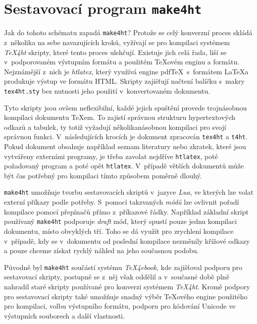 \documentclass{csbulletin}
\newcommand\nazev[1]{\textit{#1}}
\newcommand\prikaz[1]{\texttt{#1}}
\begin{document}
\section{Sestavovací program \prikaz{make4ht}}

Jak do tohoto schématu zapadá \prikaz{make4ht}? Protože se celý konverzní proces
skládá z~několika na sebe navazujících kroků, vyžívají se pro kompilaci
systémem \nazev{TeX4ht} skripty, které tento proces ulehčují. Existuje jich
celá řada, liší se v~podporovaném výstupním formátu a použitém \TeX ovém enginu
a formátu. Nejznámější z~nich je \nazev{htlatex}, který využívá engine pdf\TeX\
s~formátem \LaTeX a produkuje výstup ve formátu HTML. Skripty zajišťují načtení
balíčku s~makry \prikaz{tex4ht.sty} bez nutnosti jeho použití
v~konvertovaném dokumentu.

Tyto skripty jsou ovšem neflexibilní, každé jejich spuštění provede
trojnásobnou kompilaci dokumentu \TeX em. To zajistí správnou strukturu
hypertextových odkazů a tabulek, ty totiž vyžadují několikanásobnou kompilaci
pro svojí správnou funkci. V~následujících krocích je dokument zpracován
\prikaz{tex4ht} a \prikaz{t4ht}. Pokud dokument obsahuje například seznam
literatury nebo zkratek, které jsou vytvářeny externími programy, je třeba
zavolat nejdříve \prikaz{htlatex}, poté požadovaný program a poté opět
\prikaz{htlatex}. V~případě větších dokumentů může být čas potřebný pro
kompilaci tímto způsobem poměrně dlouhý.

\prikaz{make4ht} umožňuje tvorbu sestavovacích skriptů v~jazyce \nazev{Lua}, ve
kterých lze volat externí příkazy podle potřeby. S~pomocí takzvaných
\nazev{módů} lze ovlivnit pořadí kompilace pomocí přepínačů přímo z~příkazové
řádky. Například základní skript používaný \prikaz{make4ht} podporuje
\nazev{draft} mód, který spustí pouze jednu kompilaci dokumentu, místo
obvyklých tří. Toho se dá využít pro zrychlení kompilace v~případě, kdy se
v~dokumentu od poslední kompilace nezměnily křížové odkazy a pouze chceme získat
rychlý náhled na jeho současnou podobu.

Původně byl \prikaz{make4ht} součástí systému \nazev{TeX4ebook}, kde zajišťoval
podporu pro sestavovací skripty, postupně se z~něj však oddělil a v~současné
době plně nahradil staré skripty používané pro konverzi systémem \nazev{TeX4ht}. 
Kromě podpory pro sestavovací skripty také umožňuje snadný výběr \TeX ového
engine použitého pro kompilaci, volbu výstupního formátu, podporu pro kódování
Unicode ve výstupních souborech a další vlastnosti.
\end{document}
